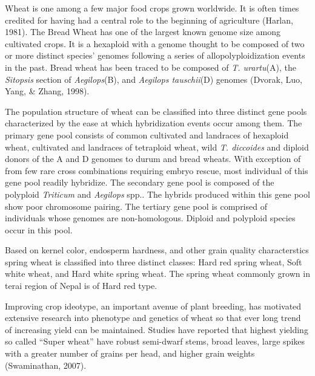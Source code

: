 \documentclass[12pt,oneside]{dukestatscithesis} %
\begin{document}
Wheat is one among a few major food crops grown worldwide. It is often times credited for having had a central role to the beginning of agriculture (Harlan, 1981). The Bread Wheat has one of the largest known genome size among cultivated crops. It is a hexaploid with a genome thought to be composed of two or more distinct species' genomes following a series of allopolyploidization events in the past. Bread wheat has been traced to be composed of \emph{T. urartu}(A), the \emph{Sitopsis} section of \emph{Aegilops}(B), and \emph{Aegilops tauschii}(D) genomes (Dvorak, Luo, Yang, \& Zhang, 1998).

The population structure of wheat can be classified into three distinct gene pools characterized by the ease at which hybridization events occur among them. The primary gene pool consists of common cultivated and landraces of hexaploid wheat, cultivated and landraces of tetraploid wheat, wild \emph{T. diccoides} and diploid donors of the A and D genomes to durum and bread wheats. With exception of from few rare cross combinations requiring embryo rescue, most individual of this gene pool readily hybridize. The secondary gene pool is composed of the polyploid \emph{Triticum} and \emph{Aegilops} spp.. The hybrids produced within this gene pool show poor chromosome pairing. The tertiary gene pool is comprised of individuals whose genomes are non-homologous. Diploid and polyploid species occur in this pool.

Based on kernel color, endosperm hardness, and other grain quality characterstics spring wheat is classified into three distinct classes: Hard red spring wheat, Soft white wheat, and Hard white spring wheat. The spring wheat commonly grown in terai region of Nepal is of Hard red type.

Improving crop ideotype, an important avenue of plant breeding, has motivated extensive research into phenotype and genetics of wheat so that ever long trend of increasing yield can be maintained. Studies have reported that highest yielding so called ``Super wheat'' have robust semi-dwarf stems, broad leaves, large spikes with a greater number of grains per head, and higher grain weights (Swaminathan, 2007).
\end{document}
